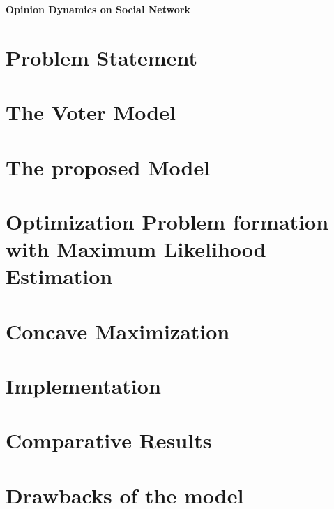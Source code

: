 \clearpage
\begin{center}
\huge{\textbf{Opinion Dynamics on Social Network}} 
\end{center}
\newpage
\section*{Problem Statement}

\section*{The Voter Model}

\section*{The proposed Model}

\section*{Optimization Problem formation with Maximum Likelihood Estimation}

\section*{Concave Maximization}
\section*{Implementation}

\section*{Comparative Results}
\section*{Drawbacks of the model}